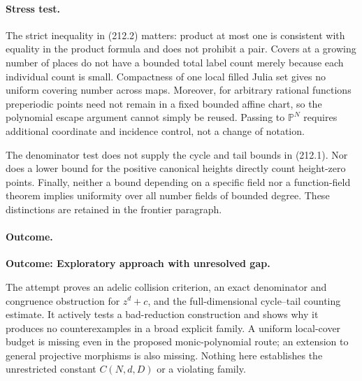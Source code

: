 \documentclass[11pt,a4paper]{article}
\newcommand{\PP}{\mathbb P}
\begin{document}
\paragraph{Stress test.}
The strict inequality in (212.2) matters: product at most one is consistent
with equality in the product formula and does not prohibit a pair. Covers
at a growing number of places do not have a bounded total label count
merely because each individual count is small. Compactness of one local
filled Julia set gives no uniform covering number across maps. Moreover,
for arbitrary rational functions preperiodic points need not remain in a
fixed bounded affine chart, so the polynomial escape argument cannot simply
be reused. Passing to $\PP^N$ requires additional coordinate and incidence
control, not a change of notation.

The denominator test does not supply the cycle and tail bounds in (212.1).
Nor does a lower bound for the positive canonical heights directly count
height-zero points. Finally, neither a bound depending on a specific field
nor a function-field theorem implies uniformity over all number fields of
bounded degree. These distinctions are retained in the frontier paragraph.

\paragraph{Outcome.}
\textbf{Outcome: Exploratory approach with unresolved gap.}

The attempt proves an adelic collision criterion, an exact denominator and
congruence obstruction for $z^d+c$, and the full-dimensional cycle--tail
counting estimate. It actively tests a bad-reduction construction and shows
why it produces no counterexamples in a broad explicit family. A uniform
local-cover budget is missing even in the proposed monic-polynomial route;
an extension to general projective morphisms is also missing. Nothing here
establishes the unrestricted constant $C(N,d,D)$ or a violating family.
\end{document}
